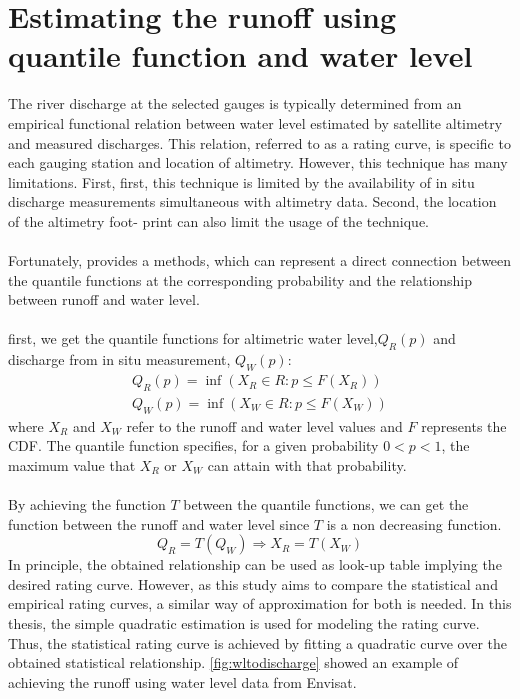 \section{Estimating the runoff using quantile function and water level}\label{sec:waterlevel}
The river discharge at the selected gauges is typically determined from an empirical functional relation between water level estimated by satellite altimetry and measured discharges. This relation, referred to as a rating curve, is specific to each gauging station and location of altimetry. However, this technique has many limitations. First, first, this technique is limited by the availability of in situ discharge measurements simultaneous with altimetry data. Second, the location of the altimetry foot- print can also limit the usage of the technique.\\\\
Fortunately, \cite{tourian2013quantile} provides a methods, which can represent a direct connection between the quantile functions at the corresponding probability and the relationship between runoff and water level. \\\\
first, we get the quantile functions for altimetric water level,$Q_R(p)$ and discharge from in situ measurement, $Q_W(p)$:
\begin{gather*}
	Q_R(p) = \inf(X_R \in R: p\leq F(X_R)) \\
	Q_W(p) = \inf(X_W \in R: p\leq F(X_W)) 
\end{gather*}
where $X_R$ and $X_W$ refer to the runoff and water level values and $F$ represents the CDF. The quantile function specifies, for a given probability $0 < p < 1$, the maximum value that $X_R$ or $X_W$ can attain with that probability.\\\\
By achieving the function $T$ between the quantile functions, we can get the function between the runoff and water level since $T$ is a non decreasing function. 
\begin{equation}
	Q_R = T(Q_W) \Longrightarrow X_R = T(X_W)
\end{equation}
In principle, the obtained relationship can be used as look-up table implying the desired rating curve. However, as this study aims to compare the statistical and empirical rating curves, a similar way of approximation for both is needed. In this thesis, the simple quadratic estimation is used for modeling the rating curve. Thus, the statistical rating curve is achieved by fitting a quadratic curve over the obtained statistical relationship. \autoref{fig:wltodischarge} showed an example of achieving the runoff using water level data from Envisat. 
